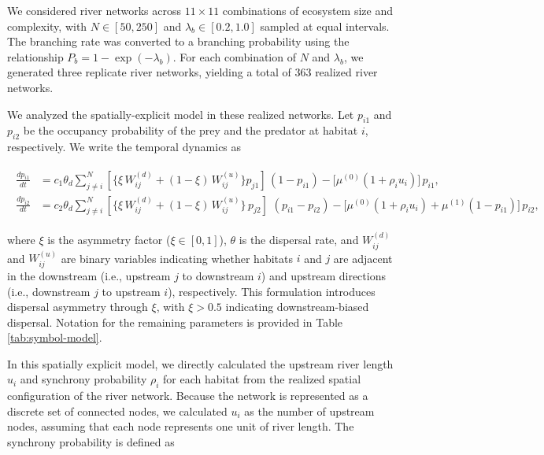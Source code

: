 \documentclass[11pt, class=article, crop=false]{standalone}
\theoremstyle{definition}
\begin{document}
We considered river networks across $11 \times 11$ combinations of ecosystem size and complexity, with $N \in [50,250]$ and $\lambda_b \in [0.2,1.0]$ sampled at equal intervals. 
The branching rate was converted to a branching probability using the relationship $P_b = 1 - \exp(-\lambda_b)$.
For each combination of $N$ and $\lambda_b$, we generated three replicate river networks, yielding a total of $363$ realized river networks.

We analyzed the spatially-explicit model in these realized networks.
Let $p_{i1}$ and $p_{i2}$ be the occupancy probability of the prey and the predator at habitat $i$, respectively.
We write the temporal dynamics as

\begin{align}
\begin{split}
    \frac{d p_{i1}}{dt} 
    &= 
    c_1 
    \theta_d
    \sum_{j \ne i}^N 
    \left[
    \bigl\{
    \xi \, W^{(d)}_{ij} + 
    (1 - \xi) \, W^{(u)}_{ij}
    \bigr\}
    p_{j1} 
    \right]\,
    (1 - p_{i1}) 
    - 
    \bigl[
    \mu^{(0)}(1 + \rho_iu_i)
    \bigr]\,p_{i1},\\
    \frac{d p_{i2}}{dt} 
    &= 
    c_2 
    \theta_d
    \sum_{j \ne i}^N 
    \left[
    \bigl\{
    \xi \, W^{(d)}_{ij} + 
    (1 - \xi) \, W^{(u)}_{ij}
    \bigr\}\,
    p_{j2} 
    \right]\,
    \, (p_{i1} - p_{i2}) 
    - 
    \bigl[
    \mu^{(0)}(1 + \rho_iu_i) +
    \mu^{(1)}(1 - p_{i1})
    \bigr]\,p_{i2},
\label{eq:se-model}
\end{split}
\end{align}

where $\xi$ is the asymmetry factor ($\xi \in [0,1]$), $\theta$ is the dispersal rate, and $W_{ij}^{(d)}$ and $W_{ij}^{(u)}$ are binary variables indicating whether habitats $i$ and $j$ are adjacent in the downstream (i.e., upstream $j$ to downstream $i$) and upstream directions (i.e., downstream $j$ to upstream $i$), respectively. 
This formulation introduces dispersal asymmetry through $\xi$, with $\xi > 0.5$ indicating downstream-biased dispersal.
Notation for the remaining parameters is provided in Table \ref{tab:symbol-model}.

In this spatially explicit model, we directly calculated the upstream river length $u_i$ and synchrony probability $\rho_i$ for each habitat from the realized spatial configuration of the river network. 
Because the network is represented as a discrete set of connected nodes, we calculated $u_i$ as the number of upstream nodes, assuming that each node represents one unit of river length.
The synchrony probability is defined as
\end{document}
